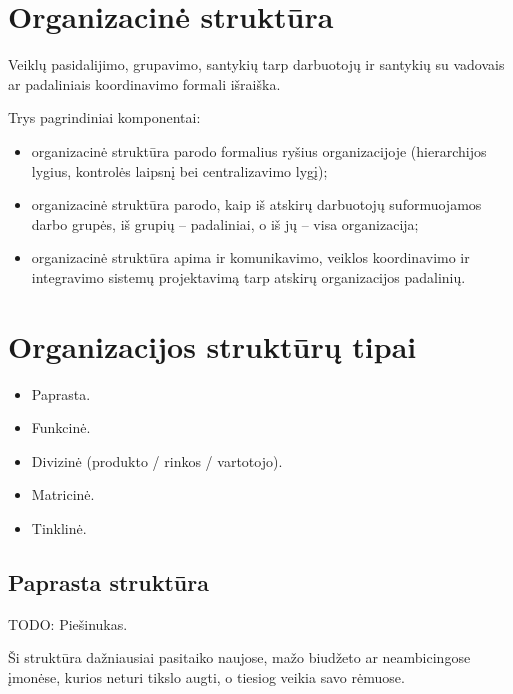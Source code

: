 \section{Organizacinė struktūra}

\begin{defn}
  Veiklų pasidalijimo, grupavimo, santykių tarp darbuotojų ir santykių
  su vadovais ar padaliniais koordinavimo formali išraiška.
\end{defn}

Trys pagrindiniai komponentai:
\begin{itemize}
  \item organizacinė struktūra parodo formalius ryšius organizacijoje
    (hierarchijos lygius, kontrolės laipsnį bei centralizavimo lygį);
  \item organizacinė struktūra parodo, kaip iš atskirų darbuotojų
    suformuojamos darbo grupės, iš grupių – padaliniai, o iš jų –
    visa organizacija;
  \item organizacinė struktūra apima ir komunikavimo, veiklos
    koordinavimo ir integravimo sistemų projektavimą tarp atskirų
    organizacijos padalinių.
\end{itemize}

\section{Organizacijos struktūrų tipai}

\begin{itemize}
  \item Paprasta.
  \item Funkcinė.
  \item Divizinė (produkto / rinkos / vartotojo).
  \item Matricinė.
  \item Tinklinė.
\end{itemize}

\subsection{Paprasta struktūra}

TODO: Piešinukas.

Ši struktūra dažniausiai pasitaiko naujose, mažo biudžeto ar
neambicingose įmonėse, kurios neturi tikslo augti, o tiesiog veikia
savo rėmuose.


